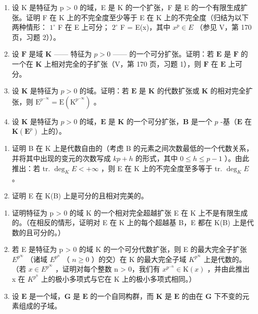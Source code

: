 \begin{enumerate}
\def\labelenumi{\arabic{enumi})}
\setcounter{enumi}{2}
\item
  设 K 是特征为 p \textgreater{} 0 的域，E 是 K 的一个扩张，F 是 E 的一个有限生成扩张。证明 F 在 K 上的不完全度至少等于 E 在 K 上的不完全度（归结为以下两种情形： \(1^{\circ}\) F 在 E 上可分； \(2^{\circ}\) F = E(x)，其中 \(x^{p} \in E\) （参见 V，第 170 页，习题 2））。
\item
  设 \(\mathbf{F}\) 是域 \(\mathbf{K}\) —— 特征为 \(p > 0\) —— 的一个可分扩张。证明：若 \(\mathbf{E}\) 是 \(\mathbf{F}\) 的一个在 \(\mathbf{K}\) 上相对完全的子扩张（V，第 170 页，习题 1），则 \(\mathbf{F}\) 在 \(\mathbf{E}\) 上可分。
\item
  设 \(\mathbf{K}\) 是特征为 \(p > 0\) 的域。证明：若 \(\mathbf{E}\) 是 \(\mathbf{K}\) 的代数扩张或 \(\mathbf{K}\) 的相对完全扩张，则 \(\mathrm{E}^{p^{-\infty}} = \mathrm{E}(\mathrm{K}^{p^{-\infty}})\) 。
\item
  设 \(\mathbf{K}\) 是特征为 \(p > 0\) 的域，\(\mathbf{E}\) 是 \(\mathbf{K}\) 的一个可分扩张，\(\mathbf{B}\) 是一个 \(p\) -基（\(\mathbf{E}\) 在 \(\mathbf{K}(\mathbf{E}^p)\) 上的）。
\end{enumerate}

\begin{enumerate}
\def\labelenumi{\alph{enumi})}
\item
  证明 B 在 K 上是代数自由的（考虑 B 的元素之间次数最低的一个代数关系，并将其中出现的变元的次数写成 \(kp + h\) 的形式，其中 \(0 \leqslant h \leqslant p - 1\) ）。由此推出：若 tr. \(\deg_{K}E < +\infty\) ，则 E 在 K 上的不完全度至多等于 tr. \(\deg_{K}E\) 。
\item
  证明 E 在 K(B) 上是可分的且相对完美的。
\end{enumerate}

\begin{enumerate}
\def\labelenumi{\arabic{enumi})}
\setcounter{enumi}{6}
\item
  证明特征为 p \textgreater{} 0 的域 K 的一个相对完全超越扩张 E 在 K 上不是有限生成的。（在相反的情形，证明对 E 在 K 上的每个超越基 B，E 都在 K(B) 上是代数的且可分的。）
\item
  若 E 是特征为 p \textgreater{} 0 的域 K 的一个可分代数扩张，则 E 的最大完全子扩张 \(E^{p^{\infty}}\) （诸域 \(E^{p^{n}}\) （ \(n \geqslant 0\) ）的交）在 K 的最大完全子域 \(K^{p^{\infty}}\) 上是代数的。（若 \(x \in E^{p^{\infty}}\) ，证明对每个整数 n \textgreater{} 0，我们有 \(x^{p^{-n}} \in \mathrm{K}(x)\) ，并由此推出 x 在 \(K^{p^{n}}\) 上的极小多项式与它在 K 上的极小多项式相同。）
\item
  设 \(\mathbf{E}\) 是一个域，\(\mathbf{G}\) 是 \(\mathbf{E}\) 的一个自同构群，而 \(\mathbf{K}\) 是 \(\mathbf{E}\) 的由在 \(\mathbf{G}\) 下不变的元素组成的子域。
\end{enumerate}

